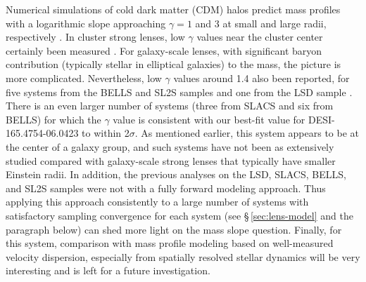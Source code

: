 
Numerical simulations of cold dark matter (CDM) halos predict mass profiles with a logarithmic slope approaching $\gamma = 1$ and 3 
at small and large radii, respectively \citep[e.g.,][NFW]{navarro1996a}.
In cluster strong lenses, low $\gamma$ values near the cluster center certainly  been measured \citep[e.g.,][at 1.26]{broadhurst2000a}.
For galaxy-scale lenses, with significant baryon  contribution (typically stellar in elliptical galaxies) to the mass, 
the picture is more complicated.
Nevertheless, low $\gamma$ values around 1.4  also been reported, 
for five systems from the BELLS and SL2S samples \citep{LiR2018a} and one from the LSD sample \citep{treu2004a}. 
There is an even larger number of systems (three from SLACS and six from BELLS) for which the $\gamma$ value is consistent with our best-fit value for DESI-165.4754-06.0423 to within 2$\sigma$.
As mentioned earlier, this system appears to be at the center of a galaxy group, 
and such systems have not been as extensively studied compared with galaxy-scale strong lenses that typically have smaller Einstein radii.
In addition, the previous analyses on the LSD, SLACS, BELLS, and SL2S samples were not  with a fully forward modeling approach.
Thus applying this approach
consistently to a large number of systems with satisfactory sampling convergence for each system
(see \S\,\ref{sec:lens-model} and the paragraph below) 
can shed more light on the mass slope question.
Finally, for this system,
comparison with mass profile modeling based on well-measured velocity dispersion, 
especially from spatially resolved stellar dynamics  will be very interesting and is left for a future investigation.



